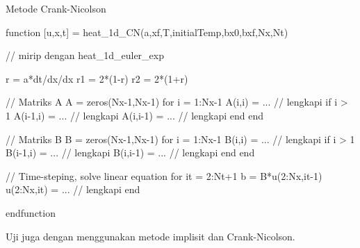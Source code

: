 \documentclass[10pt,bahasa]{article}
\begin{document}
Metode Crank-Nicolson

\begin{scilabcode}
function [u,x,t] = heat_1d_CN(a,xf,T,initialTemp,bx0,bxf,Nx,Nt)
  
  // mirip dengan heat_1d_euler_exp
  
  r  = a*dt/dx/dx
  r1 = 2*(1-r)
  r2 = 2*(1+r)
  
  // Matriks A
  A = zeros(Nx-1,Nx-1)
  for i = 1:Nx-1
    A(i,i) = ... // lengkapi
    if i > 1
      A(i-1,i) = ... // lengkapi
      A(i,i-1) = ... // lengkapi
    end
  end
  
  // Matriks B
  B = zeros(Nx-1,Nx-1)
  for i = 1:Nx-1
    B(i,i) = ... // lengkapi
    if i > 1
      B(i-1,i) = ... // lengkapi
      B(i,i-1) = ... // lengkapi
    end
  end

  // Time-steping, solve linear equation
  for it = 2:Nt+1
    b = B*u(2:Nx,it-1)
    u(2:Nx,it) = ... // lengkapi
  end
  
endfunction  
\end{scilabcode}

Uji juga dengan menggunakan metode implisit dan Crank-Nicolson.
\end{document}
